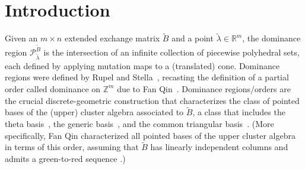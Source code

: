 \documentclass{amsart}
\theoremstyle{definition}
\theoremstyle{remark}
\numberwithin{equation}{section}
\newcommand{\integers}{\mathbb Z}
\newcommand{\reals}{\mathbb R}
\newcommand{\0}{{\mathbf{0}}}
\newcommand{\tB}{{\widetilde{B}}}
\renewcommand{\P}{\mathcal{P}}
\begin{document}
\section{Introduction}  
Given an $m\times n$ extended exchange matrix $\tB$ and a point $\tilde\lambda\in\reals^m$, the dominance region $\P_{\tilde\lambda}^\tB$ is the intersection of an infinite collection of piecewise polyhedral sets, each defined by applying mutation maps to a (translated) cone.
Dominance regions were defined by Rupel and Stella~\cite{RSDom}, recasting the definition of a partial order called dominance on $\integers^m$ due to Fan Qin~\cite{FanQin}.
Dominance regions/orders are the crucial discrete-geometric construction that characterizes the class of pointed bases of the (upper) cluster algebra associated to $\tB$, a class that includes the theta basis~\cite{GHKK}, the generic basis~\cite{Dup11}, and the common triangular basis~\cite{QinTri}. 
(More specifically, Fan Qin characterized all pointed bases of the upper cluster algebra in terms of this order, assuming that $\tB$ has linearly independent columns and admits a green-to-red sequence \cite[Theorem~1.2.1]{FanQin}.)
\end{document}
